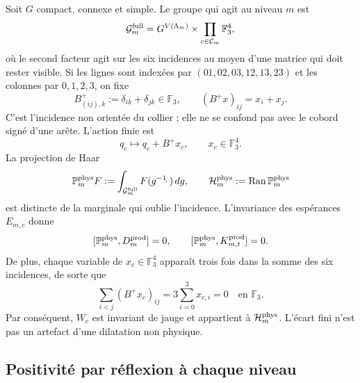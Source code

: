 Soit $G$ compact, connexe et simple. Le groupe qui agit au niveau $m$ est
\[
 \mathcal G_m^{\rm full}
 =G^{V(\Lambda_m)}\times
  \prod_{c\in\mathcal C_m}\mathbb F_3^4,
\]
où le second facteur agit sur les six incidences au moyen d’une matrice
qui doit rester visible. Si les lignes sont indexées par
$(01,02,03,12,13,23)$ et les colonnes par $0,1,2,3$, on fixe
\begin{equation}\label{eq:pdf2-ym-incidence-matrix}
 B^+_{(ij),k}:=\delta_{ik}+\delta_{jk}\in\mathbb F_3,
 \qquad
 (B^+x)_{ij}=x_i+x_j.
\end{equation}
C’est l’incidence non orientée du collier ; elle ne se confond pas avec le
cobord signé d’une arête. L’action finie est
\begin{equation}\label{eq:pdf2-ym-incidence-action}
 q_c\longmapsto q_c+B^+x_c,
 \qquad x_c\in\mathbb F_3^4.
\end{equation}
La projection de Haar
\begin{equation}\label{eq:pdf2-ym-proyeccion-fisica}
 \mathbb P_m^{\rm phys}F
 :=\int_{\mathcal G_m^{\rm full}}F(g^{-1}\!\cdot\,)\,dg,
 \qquad
 \mathcal H_m^{\rm phys}:=\operatorname{Ran}\mathbb P_m^{\rm phys}
\end{equation}
est distincte de la marginale qui oublie l'incidence. L'invariance des espérances $E_{m,c}$ donne
\begin{equation}\label{eq:pdf2-ym-reduccion}
 [\mathbb P_m^{\rm phys},D_m^{\rm prod}]=0,
 \qquad
 [\mathbb P_m^{\rm phys},K_{m,t}^{\rm prod}]=0.
\end{equation}
De plus, chaque variable de $x_c\in\mathbb F_3^4$ apparaît trois fois dans la somme des
six incidences, de sorte que
\begin{equation}\label{eq:pdf2-ym-incidence-conservation}
 \sum_{i<j}(B^+x_c)_{ij}
 =3\sum_{i=0}^3x_{c,i}=0
 \quad\text{en }\mathbb F_3.
\end{equation}
Par conséquent, $W_c$ est invariant de
jauge et appartient à $\mathcal H_m^{\rm phys}$. L’écart fini n’est pas un
artefact d’une dilatation non physique.

\subsection{Positivité par réflexion à chaque niveau}

